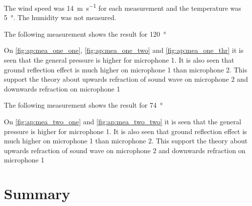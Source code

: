 The wind speed was \SI{14}{\meter\per\second} for each measurement and the temperature was \SI{5}{\degree}. The humidity was not measured. 

The following measurement shows the result for \SI{120}{\degree}


On \autoref{fig:ap:mea_one_one}, \autoref{fig:ap:mea_one_two} and \autoref{fig:ap:mea_one_thr} it is seen that the general pressure is higher for microphone 1. It is also seen that ground reflection effect is much higher on microphone 1 than microphone 2. This support the theory about upwards refraction of sound wave on microphone 2 and downwards refraction on microphone 1 

The following measurement shows the result for \SI{74}{\degree}


On \autoref{fig:ap:mea_two_one} and \autoref{fig:ap:mea_two_two} it is seen that the general pressure is higher for microphone 1. It is also seen that ground reflection effect is much higher on microphone 1 than microphone 2. This support the theory about upwards refraction of sound wave on microphone 2 and downwards refraction on microphone 1 


\section*{Summary}